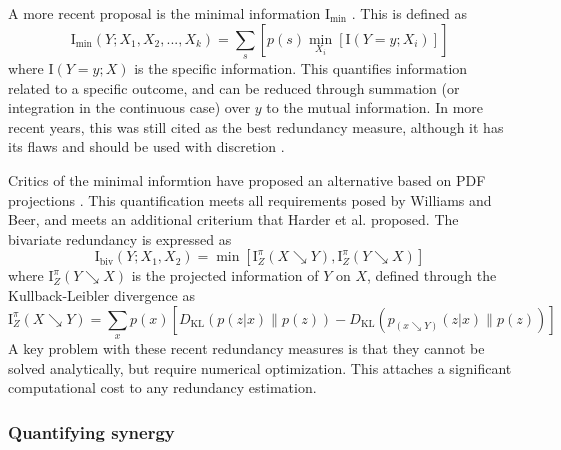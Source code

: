 \documentclass[../main.tex]{subfiles}
\begin{document}
A more recent proposal is the minimal information $\mathrm{I}_\mathrm{min}$ \cite{williams2010nonnegative}.
This is defined as
%
\begin{equation}
\mathrm{I}_\mathrm{min}(Y;{X_1, X_2,...,X_k}) = \sum_s [p(s) \min_{X_i} [\mathrm{I}(Y=y;X_i)]]
\end{equation}
%
where $\mathrm{I}(Y = y;X)$ is the specific information.
This quantifies information related to a specific outcome, and can be reduced through summation (or integration in the continuous case) over $y$ to the mutual information.
In more recent years, this was still cited as the best redundancy measure, although it has its flaws and should be used with discretion \cite{lizier2013towards, olbrich2015information}.

Critics of the minimal informtion have proposed an alternative based on PDF projections \cite{harder2013bivariate}.
This quantification meets all requirements posed by Williams and Beer, and meets an additional criterium that Harder et al. proposed.
The bivariate redundancy is expressed as
%
\begin{equation}
\mathrm{I}_\mathrm{biv}(Y;{X_1, X_2}) = \min [\mathrm{I}_Z^\pi (X \searrow Y), \mathrm{I}_Z^\pi (Y \searrow X)] 
\end{equation}
%
where $\mathrm{I}_Z^\pi (Y \searrow X)$ is the projected information of $Y$ on $X$, defined through the Kullback-Leibler divergence as
%
\begin{equation}
\mathrm{I}_Z^\pi (X \searrow Y) = \sum_x p(x) [D_\mathrm{KL} (p(z|x) \| p(z)) - D_\mathrm{KL} (p_{(x \searrow Y)}(z|x) \| p(z))]
\end{equation}
A key problem with these recent redundancy measures is that they cannot be solved analytically, but require numerical optimization.
This attaches a significant computational cost to any redundancy estimation.

\subsubsection{Quantifying synergy}
\end{document}
